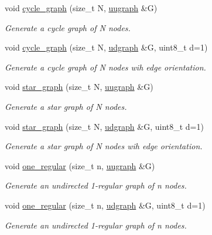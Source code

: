 \begin{DoxyCompactItemize}
void \hyperlink{namespacelgraph_1_1networks_1_1classic_abb5f4e0818cb76a434a8881dd84564cb}{cycle\-\_\-graph} (size\-\_\-t N, \hyperlink{classlgraph_1_1uugraph}{uugraph} \&G)
\begin{DoxyCompactList}\small\item\em Generate a cycle graph of {\itshape N} nodes. \end{DoxyCompactList}\item 
void \hyperlink{namespacelgraph_1_1networks_1_1classic_a3fdc2b19840d4727d4bd5ec434b3fabc}{cycle\-\_\-graph} (size\-\_\-t N, \hyperlink{classlgraph_1_1udgraph}{udgraph} \&G, uint8\-\_\-t d=1)
\begin{DoxyCompactList}\small\item\em Generate a cycle graph of {\itshape N} nodes wih edge orientation. \end{DoxyCompactList}\item 
void \hyperlink{namespacelgraph_1_1networks_1_1classic_a98b55be442b4c178e4359dd0cdb534fe}{star\-\_\-graph} (size\-\_\-t N, \hyperlink{classlgraph_1_1uugraph}{uugraph} \&G)
\begin{DoxyCompactList}\small\item\em Generate a star graph of {\itshape N} nodes. \end{DoxyCompactList}\item 
void \hyperlink{namespacelgraph_1_1networks_1_1classic_a7a659f0085a30b2801bb0efd31e8d084}{star\-\_\-graph} (size\-\_\-t N, \hyperlink{classlgraph_1_1udgraph}{udgraph} \&G, uint8\-\_\-t d=1)
\begin{DoxyCompactList}\small\item\em Generate a star graph of {\itshape N} nodes wih edge orientation. \end{DoxyCompactList}\item 
void \hyperlink{namespacelgraph_1_1networks_1_1classic_a7177ab266c5b173513fb9a28b98c05f5}{one\-\_\-regular} (size\-\_\-t n, \hyperlink{classlgraph_1_1uugraph}{uugraph} \&G)
\begin{DoxyCompactList}\small\item\em Generate an undirected 1-\/regular graph of {\itshape n} nodes. \end{DoxyCompactList}\item 
void \hyperlink{namespacelgraph_1_1networks_1_1classic_aa21699973ba38f018893ad61babcfaa3}{one\-\_\-regular} (size\-\_\-t n, \hyperlink{classlgraph_1_1udgraph}{udgraph} \&G, uint8\-\_\-t d=1)
\begin{DoxyCompactList}\small\item\em Generate an undirected 1-\/regular graph of {\itshape n} nodes. \end{DoxyCompactList}\end{DoxyCompactItemize}


